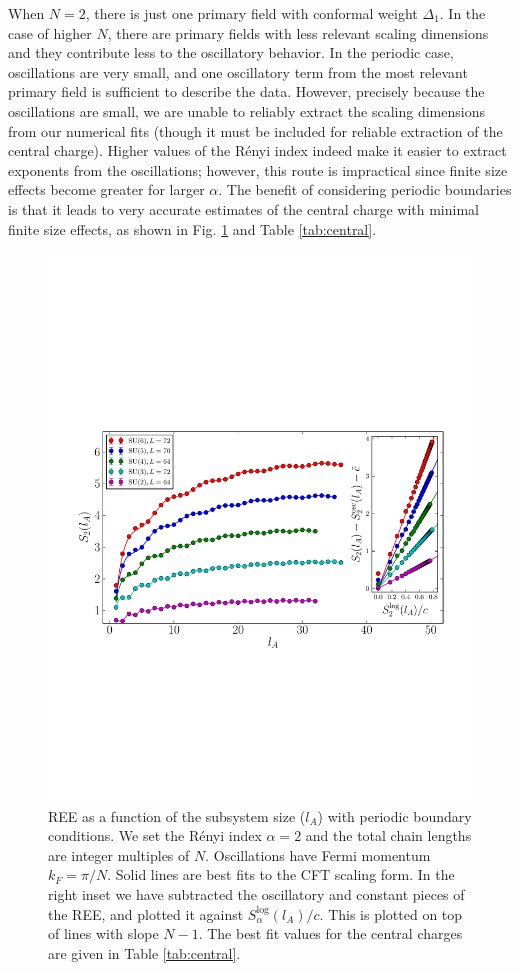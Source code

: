 \documentclass[aps,prb,reprint,floatfix]{revtex4-1}
\begin{document}
When $N=2$, there is just one primary field with conformal weight $\Delta_{1}$.  In the case of higher $N$, there are primary fields with less relevant scaling dimensions and they contribute less to the oscillatory behavior.  In the periodic case, oscillations are very small, and one oscillatory term from the most relevant primary field is sufficient to describe the data.  However, precisely because the oscillations are small, we are unable to reliably extract the scaling dimensions from our numerical fits (though it must be included for reliable extraction of the central charge).  Higher values of the R\'{e}nyi index indeed make it easier to extract exponents from the oscillations; however, this route is impractical since finite size effects become greater for larger $\alpha$.  The benefit of considering periodic boundaries is that it leads to very accurate estimates of the central charge with minimal finite size effects, as shown in Fig. \ref{fig:REE} and Table \ref{tab:central}.  
\begin{figure}
\centerline{\includegraphics[angle=0,width=1.0\columnwidth]{EE.pdf}}
\caption{REE as a function of the subsystem size ($l_{A}$) with periodic boundary conditions.  We set the R\'{e}nyi index $\alpha = 2$ and the total chain lengths are integer multiples of $N$.  Oscillations have Fermi momentum $k_{F}=\pi / N$. Solid lines are best fits to the CFT scaling form.  In the right inset we have subtracted the oscillatory and constant pieces of the REE, and plotted it against $S_{\alpha}^{\mathrm{log}}(l_{A})/c$.  This is plotted on top of lines with slope $N-1$.  The best fit values for the central charges are given in Table \ref{tab:central}.}
\label{fig:REE}
\end{figure}
\end{document}
